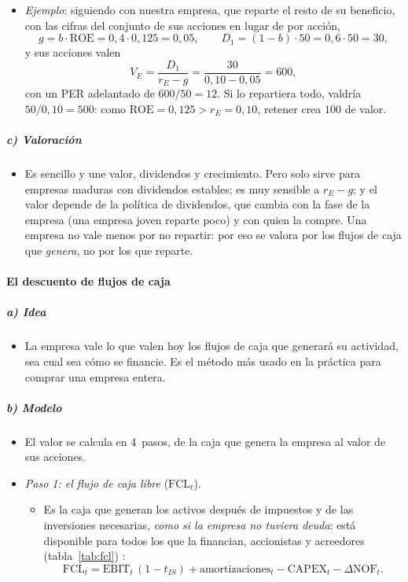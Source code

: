 \documentclass[11pt]{article}
\begin{document}
\begin{itemize}
\begin{itemize}
  \end{itemize}
\item \emph{Ejemplo}: siguiendo con nuestra empresa, que reparte el resto de su beneficio, con las cifras del conjunto de sus acciones en lugar de por acción,
  \[
  g=b\cdot\mathrm{ROE}=0{,}4\cdot0{,}125=0{,}05,\qquad D_1=(1-b)\cdot50=0{,}6\cdot50=30,
  \]
  y sus acciones valen
  \[
  V_E=\frac{D_1}{r_E-g}=\frac{30}{0{,}10-0{,}05}=600,
  \]
  con un PER adelantado de $600/50=12$. Si lo repartiera todo, valdría $50/0{,}10=500$: como $\mathrm{ROE}=0{,}125>r_E=0{,}10$, retener crea $100$ de valor.
\end{itemize}

\subparagraph{c) Valoración}

\begin{itemize}
\item Es sencillo y une valor, dividendos y crecimiento. Pero solo sirve para empresas maduras con dividendos estables; es muy sensible a $r_E-g$; y el valor depende de la política de dividendos, que cambia con la fase de la empresa (una empresa joven reparte poco) y con quien la compre. Una empresa no vale menos por no repartir: por eso se valora por los flujos de caja que \emph{genera}, no por los que reparte.
\end{itemize}

\paragraph{El descuento de flujos de caja}

\subparagraph{a) Idea}

\begin{itemize}
\item La empresa vale lo que valen hoy los flujos de caja que generará su actividad, sea cual sea cómo se financie. Es el método más usado en la práctica para comprar una empresa entera.
\end{itemize}

\subparagraph{b) Modelo}

\begin{itemize}
\item El valor se calcula en 4~pasos, de la caja que genera la empresa al valor de sus acciones.
\item \emph{Paso 1: el flujo de caja libre} ($\mathrm{FCL}_t$).
  \begin{itemize}
  \item Es la caja que generan los activos después de impuestos y de las inversiones necesarias, \emph{como si la empresa no tuviera deuda}: está disponible para todos los que la financian, accionistas y acreedores (tabla~\ref{tab:fcl}) :
  \[
  \mathrm{FCL}_t=\mathrm{EBIT}_t\,(1-t_{IS})+\text{amortizaciones}_t-\mathrm{CAPEX}_t-\Delta\mathrm{NOF}_t.
  \]
  \end{itemize}
\end{itemize}
\end{document}
